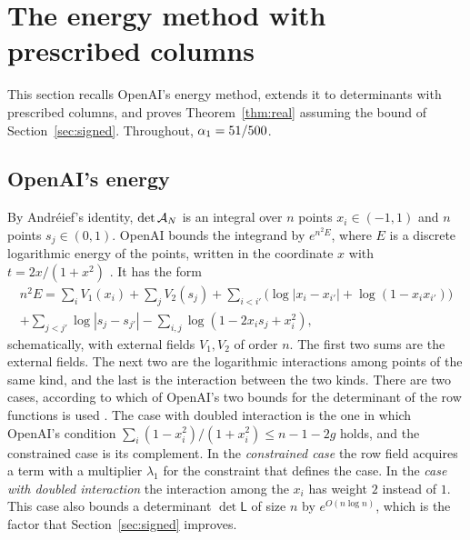 \section{The energy method with prescribed columns}\label{sec:energy}

This section recalls OpenAI's energy method, extends it to determinants with prescribed columns, and
proves Theorem~\ref{thm:real} assuming the bound of Section~\ref{sec:signed}. Throughout, $\alpha_1=51/500$.

\subsection{OpenAI's energy}\label{ssec:energy}
By Andr\'eief's identity, $\det\mathcal A_N$ is an integral over $n$ points $x_i\in(-1,1)$ and $n$ points
$s_j\in(0,1)$. OpenAI bounds the integrand by $e^{n^2E}$, where $E$ is a discrete logarithmic energy of the
points, written in the coordinate $x$ with $t=2x/(1+x^2)$ \cite[\S5]{OpenAI2026}. It has the form
\begin{multline*}
 n^2E=\sum_iV_1(x_i)+\sum_jV_2(s_j)+\sum_{i<i'}\bigl(\log|x_i-x_{i'}|+\log(1-x_ix_{i'})\bigr)\\
 +\sum_{j<j'}\log|s_j-s_{j'}|-\sum_{i,j}\log(1-2x_is_j+x_i^2),
\end{multline*}
schematically, with external fields $V_1,V_2$ of order $n$. The first two sums are the
external fields. The next two are the logarithmic interactions among points of the same kind, and the last
is the interaction between the two kinds. There are two cases, according to which of OpenAI's two bounds for
the determinant of the row functions is used \cite[Props.~5.2, 5.3]{OpenAI2026}. The case with doubled interaction is the one in which OpenAI's condition
$\sum_i(1-x_i^2)/(1+x_i^2)\le n-1-2g$ \cite[Eq.~(67)]{OpenAI2026} holds, and the constrained case is its complement. In the \emph{constrained
case} the row field acquires a term with a multiplier $\lambda_1$ for the constraint that defines the case.
In the \emph{case with doubled interaction} the interaction among the $x_i$ has weight $2$ instead of $1$. This case also bounds a determinant
$\det\mathsf L$ of size $n$ by $e^{O(n\log n)}$, which is the factor that Section~\ref{sec:signed} improves.

